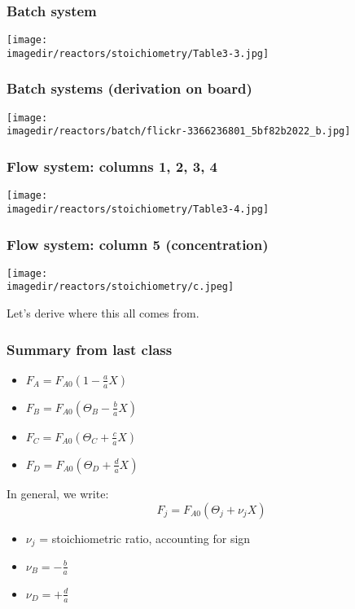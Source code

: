 \begin{frame}\frametitle{Batch system}
	\begin{center}
		\texttt{[image: \\imagedir/reactors/stoichiometry/Table3-3.jpg]}
	\end{center}
\end{frame}

\begin{frame}\frametitle{Batch systems (derivation on board)}
	\begin{center}
		\texttt{[image: \\imagedir/reactors/batch/flickr-3366236801\_5bf82b2022\_b.jpg]}
	\end{center}
\end{frame}

\begin{frame}\frametitle{Flow system: columns 1, 2, 3, 4}
	\begin{center}
		\texttt{[image: \\imagedir/reactors/stoichiometry/Table3-4.jpg]}
	\end{center}
\end{frame}

\begin{frame}\frametitle{Flow system: column 5 (concentration)}
	\begin{center}
		\texttt{[image: \\imagedir/reactors/stoichiometry/c.jpeg]}
	\end{center}
	Let's derive where this all comes from.
\end{frame}


\begin{frame}\frametitle{Summary from last class}
	\begin{itemize}
		\item	$F_A = F_{A0}\left(1-\frac{a}{a}X\right)$
		\item	$F_B = F_{A0}\left(\Theta_B-\frac{b}{a}X\right)$
		\item	$F_C = F_{A0}\left(\Theta_C+\frac{c}{a}X\right)$
		\item	$F_D = F_{A0}\left(\Theta_D+\frac{d}{a}X\right)$
	\end{itemize}
	\begin{exampleblock}{In general, we write:}
		$$F_j = F_{A0}\left(\Theta_j+\nu_j X\right)$$
	\end{exampleblock}
	\begin{itemize}
		\item	$\nu_j$ = stoichiometric ratio, accounting for sign
		\item	$\nu_B = -\frac{b}{a}$
		\item	$\nu_D = +\frac{d}{a}$
	\end{itemize}
\end{frame}

